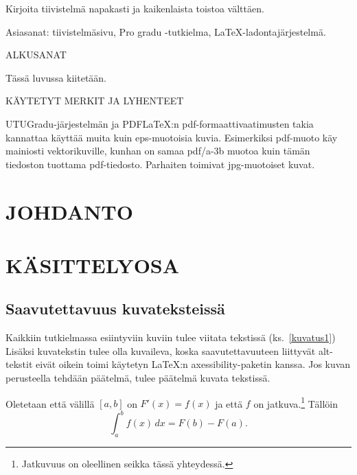 \vspace{7mm}\noindent Kirjoita tiivistelmä napakasti ja kaikenlaista toistoa välttäen.

\vspace{7mm}\noindent Asiasanat: tiivistelmäsivu, Pro gradu -tutkielma, \LaTeX-ladontajärjestelmä.


\newpage\null
\tableofcontents



\newpage\null
\pagestyle{plain} 

ALKUSANAT

Tässä luvussa kiitetään.

\newpage\null
\pagestyle{plain} 

KÄYTETYT MERKIT JA LYHENTEET

UTUGradu-järjestelmän ja PDF\LaTeX :n pdf-formaattivaatimusten takia kannattaa käyttää muita kuin eps-muotoisia kuvia. Esimerkiksi pdf-muoto käy mainiosti vektorikuville, kunhan on samaa pdf/a-3b muotoa kuin tämän tiedoston tuottama pdf-tiedosto. Parhaiten toimivat jpg-muotoiset kuvat.


\newpage\null
\pagestyle{plain} 

\section{JOHDANTO}
\lipsum[1-5]

\section{KÄSITTELYOSA}

\subsection{Saavutettavuus kuvateksteissä}

Kaikkiin tutkielmassa esiintyviin kuviin tulee viitata tekstissä (ks.~\ref{kuvatus1}) Lisäksi kuvatekstin tulee olla kuvaileva, koska saavutettavuuteen liittyvät alt-tekstit eivät oikein toimi käytetyn \LaTeX :n axessibility-paketin kanssa. Jos kuvan perusteella tehdään päätelmä, tulee päätelmä kuvata tekstissä. 
\begin{theorem} Oletetaan että välillä $[a,b]$ on $F'(x)=f(x)$ ja että $f$ on jatkuva.\footnote{Jatkuvuus on oleellinen seikka tässä yhteydessä.} Tällöin
\[
\int_a^bf(x)\,dx=F(b)-F(a).
\]
\end{theorem}

